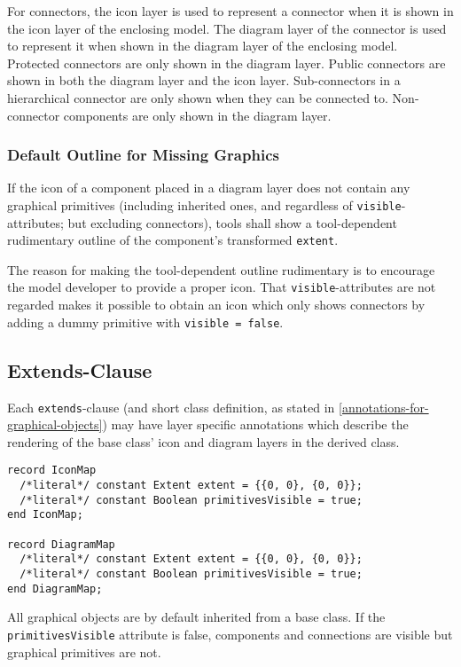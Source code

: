 For connectors, the icon layer is used to represent a connector when it is shown in the icon layer of the enclosing model.
The diagram layer of the connector is used to represent it when shown in the diagram layer of the enclosing model.
Protected connectors are only shown in the diagram layer.
Public connectors are shown in both the diagram layer and the icon layer.
Sub-connectors in a hierarchical connector are only shown when they can be connected to.
Non-connector components are only shown in the diagram layer.

\subsubsection{Default Outline for Missing Graphics}\label{default-outline-for-missing-graphics}
If the icon of a component placed in a diagram layer does not contain any graphical primitives (including inherited ones, and regardless of \lstinline!visible!-attributes; but excluding connectors), tools shall show a tool-dependent rudimentary outline of the component's transformed \lstinline!extent!.

\begin{nonnormative}
The reason for making the tool-dependent outline rudimentary is to encourage the model developer to provide a proper icon.
That \lstinline!visible!-attributes are not regarded makes it possible to obtain an icon which only shows connectors by adding a dummy primitive with \lstinline!visible = false!.
\end{nonnormative}

\subsection{Extends-Clause}\label{extends-clause}

Each \lstinline!extends!-clause (and short class definition, as stated in \cref{annotations-for-graphical-objects}) may have layer specific annotations which describe the rendering of the base class' icon and diagram layers in the derived class.

\begin{lstlisting}[language=modelica]
record IconMap
  /*literal*/ constant Extent extent = {{0, 0}, {0, 0}};
  /*literal*/ constant Boolean primitivesVisible = true;
end IconMap;

record DiagramMap
  /*literal*/ constant Extent extent = {{0, 0}, {0, 0}};
  /*literal*/ constant Boolean primitivesVisible = true;
end DiagramMap;
\end{lstlisting}%
All graphical objects are by default inherited from a base class.
If the \lstinline!primitivesVisible! attribute is false, components and connections are visible but graphical primitives are not.

